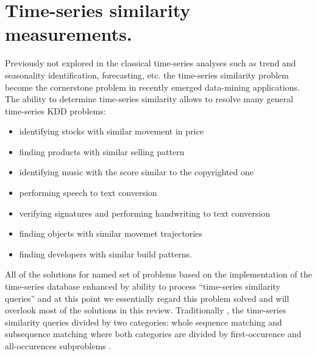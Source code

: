 \chapter{Time-series similarity measurements.}
Previously not explored in the classical time-series analyses such as trend and seasonality identification, forecasting, etc. the time-series similarity problem become the cornerstone problem in recently emerged data-mining applications. The ability to determine time-series similarity allows to resolve many general time-series KDD problems:
\begin{itemize}
	\item identifying stocks with similar movement in price \cite{citeulike:4295242} \cite{citeulike:4031865} \cite{citeulike:4025073}
	\item finding products with similar selling pattern \cite{citeulike:4326324}
	\item identifying music with the score similar to the copyrighted one \cite{citeulike:3821484} \cite{citeulike:3815076}
	\item performing speech to text conversion \cite{citeulike:3728228}
	\item verifying signatures and performing handwriting to text conversion \cite{citeulike:3733947} \cite{citeulike:3513035}
	\item finding objects with similar movemet trajectories \cite{citeulike:964832} \cite{citeulike:3728229} \cite{citeulike:3815864}
	\item finding developers with similar build patterns.
\end{itemize}

All of the solutions for named set of problems based on the implementation of the time-series database enhanced by ability to process ``time-series similarity queries'' and at this point we essentially regard this problem solved and will overlook most of the solutions in this review.  Traditionally \cite{citeulike:3973409}, the time-series similarity queries divided by two categories: whole sequence matching and subsequence matching where both categories are divided by first-occurence and all-occurences subproblems \cite{citeulike:3815880}. 

